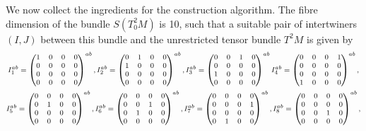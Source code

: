We now collect the ingredients for the construction algorithm. The fibre dimension of the bundle $S(T^2_0M)$ is 10, such that a suitable pair of intertwiners $(I,J)$ between this bundle and the unrestricted tensor bundle $T^2M$ is given by
\begin{equation}\label{inter_metric_I}
  \footnotesize
  \begin{gathered}
  I^{ab}_1 = \begin{pmatrix}1 & 0 & 0 & 0 \\ 0 & 0 & 0 & 0 \\ 0 & 0 & 0 & 0 \\ 0 & 0 & 0 & 0\end{pmatrix}^{ab}, I^{ab}_2 = \begin{pmatrix}0 & 1 & 0 & 0 \\ 1 & 0 & 0 & 0 \\ 0 & 0 & 0 & 0 \\ 0 & 0 & 0 & 0\end{pmatrix}^{ab}, I^{ab}_3 = \begin{pmatrix}0 & 0 & 1 & 0 \\ 0 & 0 & 0 & 0 \\ 1 & 0 & 0 & 0 \\ 0 & 0 & 0 & 0\end{pmatrix}^{ab} I^{ab}_4 = \begin{pmatrix}0 & 0 & 0 & 1 \\ 0 & 0 & 0 & 0 \\ 0 & 0 & 0 & 0 \\ 1 & 0 & 0 & 0\end{pmatrix}^{ab}, \\
  I^{ab}_5 = \begin{pmatrix}0 & 0 & 0 & 0 \\ 0 & 1 & 0 & 0 \\ 0 & 0 & 0 & 0 \\ 0 & 0 & 0 & 0\end{pmatrix}^{ab}, I^{ab}_6 = \begin{pmatrix}0 & 0 & 0 & 0 \\ 0 & 0 & 1 & 0 \\ 0 & 1 & 0 & 0 \\ 0 & 0 & 0 & 0\end{pmatrix}^{ab}, I^{ab}_7 = \begin{pmatrix}0 & 0 & 0 & 0 \\ 0 & 0 & 0 & 1 \\ 0 & 0 & 0 & 0 \\ 0 & 1 & 0 & 0\end{pmatrix}^{ab}, I^{ab}_8 = \begin{pmatrix}0 & 0 & 0 & 0 \\ 0 & 0 & 0 & 0 \\ 0 & 0 & 1 & 0 \\ 0 & 0 & 0 & 0\end{pmatrix}^{ab}, \\

\end{gathered}
\end{equation}
